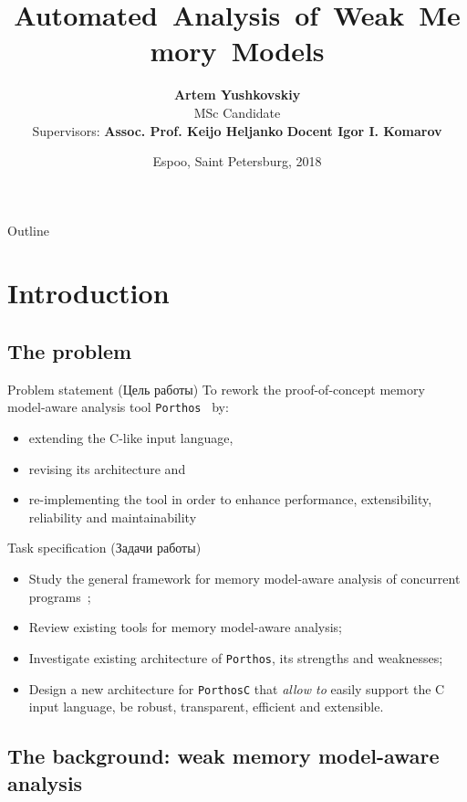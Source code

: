 \documentclass{beamer}
\title{\nohyphens{\textbf{Automated~Analysis~of~Weak~Memory~Models}}}
\author{\textbf{Artem Yushkovskiy}\inst{1,2} \\ 
{\scriptsize MSc Candidate}
\\ \vspace{1em}
{\footnotesize\raggedleft Supervisors: \textbf{Assoc. Prof. Keijo Heljanko}\inst{1} \newline
\hphantom{Supervis} \textbf{Docent Igor I. Komarov}\inst{2} }
}%
\institute %
{
  \inst{1}%
  Department of Computer Science, \\
  School of Science, \\
  \textbf{Aalto University} (Espoo, Finland)%
  \and
  \inst{2}%
  Faculty of Information Security \\
  and Computer Technologies, \\
  \textbf{ITMO University} (Saint Petersburg, Russia)%
}
\date{\scriptsize Espoo, Saint Petersburg, 2018}
\begin{document}
\begin{frame}
  \titlepage
\end{frame}

\begin{frame}{Outline}
  \tableofcontents
\end{frame}




\section{Introduction}

\subsection{The problem}


\begin{frame}{Problem statement (Цель работы)}
To rework the proof-of-concept memory model-aware analysis tool \texttt{Porthos}~\cite{Porthos17a} by:
\begin{itemize}
\item extending the C-like input language,
\item revising its architecture and
\item re-implementing the tool in order to enhance performance, extensibility, reliability and maintainability
\end{itemize}
\end{frame}


\begin{frame}{Task specification (Задачи работы)}
\begin{itemize}
\item Study the general framework for memory model-aware analysis of concurrent programs~\cite{alglave2010shared};
\item Review existing tools for memory model-aware analysis;
\item Investigate existing architecture of \texttt{Porthos}, its strengths and weaknesses;
\item Design a new architecture for \texttt{PorthosC} that \textit{allow to} easily support the C input language, be robust, transparent, efficient and extensible.
\end{itemize}
\end{frame}


\subsection{The background: weak memory model-aware analysis}
\end{document}
